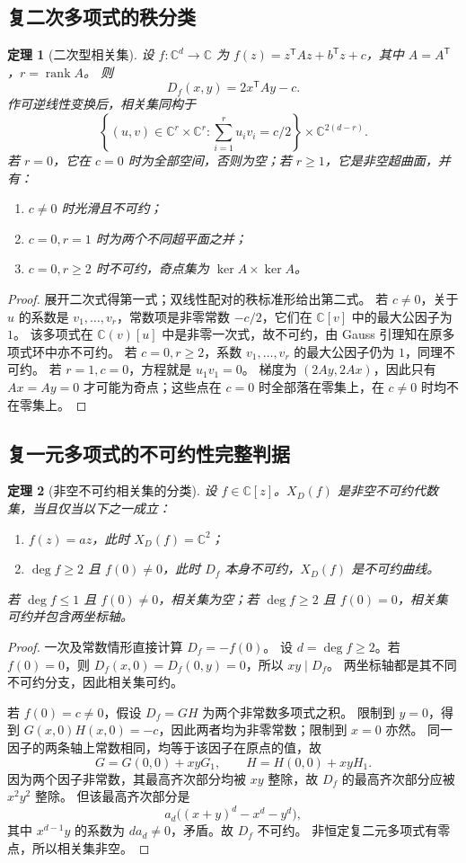 \documentclass[11pt,a4paper,oneside,openany]{book}
\theoremstyle{lecture}
\newtheorem{theorem}{定理}[section]
\newcommand{\C}{\mathbb C}
\DeclareMathOperator{\rank}{rank}
\numberwithin{equation}{section}
\begin{document}
\subsection{复二次多项式的秩分类}
\begin{theorem}[二次型相关集]\label{geo:thm:quadratic}
设 $f:\C^d\to\C$ 为
$f(z)=z^{\mathsf T}Az+b^{\mathsf T}z+c$，其中 $A=A^{\mathsf T}$，$r=\rank A$。
则
\[
 D_f(x,y)=2x^{\mathsf T}Ay-c.
\]
作可逆线性变换后，相关集同构于
\[
 \left\{(u,v)\in\C^r\times\C^r:\sum_{i=1}^r u_iv_i=c/2\right\}
 \times\C^{2(d-r)}.
\]
若 $r=0$，它在 $c=0$ 时为全部空间，否则为空；若 $r\ge1$，它是非空超曲面，并有：
\begin{enumerate}
\item $c\ne0$ 时光滑且不可约；
\item $c=0,r=1$ 时为两个不同超平面之并；
\item $c=0,r\ge2$ 时不可约，奇点集为 $\ker A\times\ker A$。
\end{enumerate}
\end{theorem}
\begin{proof}
展开二次式得第一式；双线性配对的秩标准形给出第二式。
若 $c\ne0$，关于 $u$ 的系数是 $v_1,\ldots,v_r$，常数项是非零常数 $-c/2$，它们在 $\C[v]$ 中的最大公因子为 $1$。
该多项式在 $\C(v)[u]$ 中是非零一次式，故不可约，由 Gauss 引理知在原多项式环中亦不可约。
若 $c=0,r\ge2$，系数 $v_1,\ldots,v_r$ 的最大公因子仍为 $1$，同理不可约。
若 $r=1,c=0$，方程就是 $u_1v_1=0$。
梯度为 $(2Ay,2Ax)$，因此只有 $Ax=Ay=0$ 才可能为奇点；这些点在 $c=0$ 时全部落在零集上，在 $c\ne0$ 时均不在零集上。
\end{proof}

\subsection{复一元多项式的不可约性完整判据}
\begin{theorem}[非空不可约相关集的分类]\label{geo:thm:irreducible}
设 $f\in\C[z]$。$X_D(f)$ 是非空不可约代数集，当且仅当以下之一成立：
\begin{enumerate}
\item $f(z)=az$，此时 $X_D(f)=\C^2$；
\item $\deg f\ge2$ 且 $f(0)\ne0$，此时 $D_f$ 本身不可约，$X_D(f)$ 是不可约曲线。
\end{enumerate}
若 $\deg f\le1$ 且 $f(0)\ne0$，相关集为空；若 $\deg f\ge2$ 且 $f(0)=0$，相关集可约并包含两坐标轴。
\end{theorem}
\begin{proof}
一次及常数情形直接计算 $D_f=-f(0)$。
设 $d=\deg f\ge2$。若 $f(0)=0$，则 $D_f(x,0)=D_f(0,y)=0$，所以 $xy\mid D_f$。
两坐标轴都是其不同不可约分支，因此相关集可约。

若 $f(0)=c\ne0$，假设 $D_f=GH$ 为两个非常数多项式之积。
限制到 $y=0$，得到 $G(x,0)H(x,0)=-c$，因此两者均为非零常数；限制到 $x=0$ 亦然。
同一因子的两条轴上常数相同，均等于该因子在原点的值，故
\[
 G=G(0,0)+xyG_1,\qquad H=H(0,0)+xyH_1.
\]
因为两个因子非常数，其最高齐次部分均被 $xy$ 整除，故 $D_f$ 的最高齐次部分应被 $x^2y^2$ 整除。
但该最高齐次部分是
\[
 a_d\bigl((x+y)^d-x^d-y^d\bigr),
\]
其中 $x^{d-1}y$ 的系数为 $d a_d\ne0$，矛盾。故 $D_f$ 不可约。
非恒定复二元多项式有零点，所以相关集非空。
\end{proof}
\end{document}
